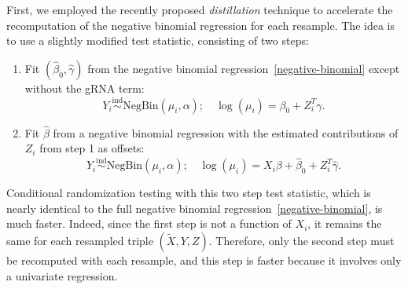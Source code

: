 \documentclass{nature}
\begin{document}
First, we employed the recently proposed\cite{Liu2020} \textit{distillation} technique to accelerate the recomputation of the negative binomial regression for each resample. The idea is to use a slightly modified test statistic, consisting of two steps:
\begin{enumerate}
	\item Fit $(\widehat \beta_0, \widehat \gamma)$ from the negative binomial regression~\eqref{negative-binomial} except without the gRNA term:
	\begin{equation}
	Y_i \overset{\text{ind}}\sim \textrm{NegBin}(\mu_i, \alpha); \quad \log(\mu_i) = \beta_0 + Z_i^T \gamma.
	\label{negative-binomial-distillation}
	\end{equation}
	\item Fit $\widehat \beta$ from a negative binomial regression with the estimated contributions of $Z_i$ from step 1 as offsets:
	\begin{equation}
	Y_i \overset{\text{ind}}\sim \textrm{NegBin}(\mu_i, \alpha); \quad \log(\mu_i) = X_i \beta + \widehat \beta_0 + Z_i^T \widehat \gamma.
	\label{distilled-negative-binomial}
	\end{equation}
\end{enumerate}
Conditional randomization testing with this two step test statistic, which is nearly identical to the full negative binomial regression~\eqref{negative-binomial}, is much faster. Indeed, since the first step is not a function of $X_i$, it remains the same for each resampled triple $(\widetilde X, Y, Z)$. Therefore, only the second step must be recomputed with each resample, and this step is faster because it involves only a univariate regression.
\end{document}
